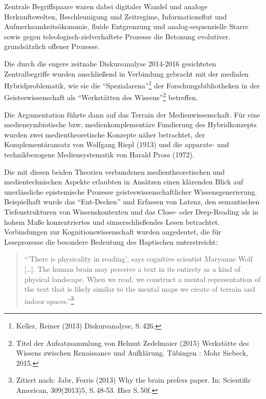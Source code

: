 \documentclass[a4paper,
fontsize=11pt,
oneside,
numbers=noperiodatend,
parskip=half-,
bibliography=totoc,
final
]{scrartcl}
\begin{document}
Zentrale Begriffspaare waren dabei digitaler Wandel und analoge
Herkunftswelten, Beschleunigung und Zeitregime, Informationsflut und
Aufmerksamkeitsökonomie, fluide Entgrenzung und analog-sequenzielle
Starre sowie gegen teleologisch-zielverhaftete Prozesse die Betonung
evolutiver, grundsätzlich offener Prozesse.

Die durch die engere zeitnahe Diskursanalyse 2014-2016 gesichteten
Zentralbegriffe wurden anschließend in Verbindung gebracht mit der
medialen Hybridproblematik, wie sie die \enquote{Spezialarena}\footnote{Keller,
  Reiner (2013) Diskursanalyse, S.\,426.} der Forschungsbibliotheken in
der Geisteswissenschaft als \enquote{Werkstätten des Wissens}\footnote{Titel
  der Aufsatzsammlung von Helmut Zedelmaier (2015) Werkstätte des
  Wissens zwischen Renaissance und Aufklärung. Tübingen : Mohr Siebeck,
  2015.} betreffen.

Die Argumentation führte dann auf das Terrain der Medienwissenschaft.
Für eine mediensymbiotische bzw. medienkomplementäre Fundierung des
Hybridkonzepts wurden zwei medientheoretische Konzepte näher betrachtet,
der Komplementäransatz von Wolfgang Riepl (1913) und die apparate- und
technikbezogene Mediensystematik von Harald Pross (1972).

Die mit diesen beiden Theorien verbundenen medientheoretischen und
medientechnischen As\-pekte erlaubten in Ansätzen einen klärenden Blick
auf unerlässliche epistemische Prozesse geisteswissenschaftlicher
Wissensgenerierung. Beispielhaft wurde das \enquote{Ent-Decken} und
Erfassen von Latenz, den semantischen Tiefenstrukturen von
Wissenskontexten und das Close- oder Deep-Reading als in hohem Maße
konzentriertes und sinnerschließendes Lesen betrachtet. Verbindungen zur
Kognitionswissenschaft wurden angedeutet, die für Leseprozesse die
besondere Bedeutung des Haptischen unterstreicht:

\begin{quote}
\enquote{'There is physicality in reading', says cognitive scientist
Maryanne Wolf {[}\ldots{}{]}. The human brain may perceive a text in its
entirety as a kind of physical landscape. When we read, we construct a
mental representation of the text that is likely similar to the mental
maps we create of terrain and indoor spaces.}\footnote{Zitiert nach:
  Jabr, Ferris (2013) Why the brain prefers paper. In: Scientific
  American, 309(2013)5, S.\,48-53. Hier S.\,50f.}
\end{quote}
\end{document}
